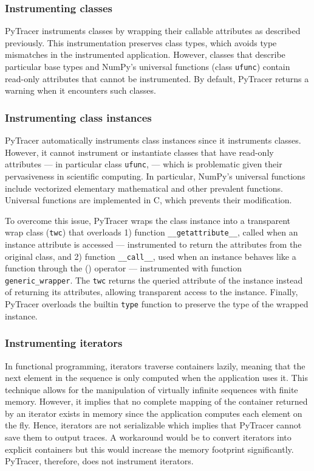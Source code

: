 \documentclass[10pt,journal,compsoc]{IEEEtran}
\newcommand{\pytracer}[0]{PyTracer\xspace}
\begin{document}
\subsubsection{Instrumenting classes}

\pytracer instruments classes by wrapping their callable attributes as described
previously. This instrumentation preserves class types, which avoids type
mismatches in the instrumented application. However, classes that describe
particular base types and NumPy's universal functions (class \texttt{ufunc})
contain read-only attributes that cannot be instrumented. By default, \pytracer
returns a warning when it encounters such classes.

\subsubsection{Instrumenting class instances}

\pytracer automatically instruments class instances since it instruments
classes. However, it cannot instrument or instantiate classes that have
read-only attributes --- in particular class \texttt{ufunc}, --- which is
problematic given their pervasiveness in scientific computing. In particular,
NumPy's universal functions include vectorized elementary mathematical and other
prevalent functions. Universal functions are implemented in C, which prevents
their modification.

To overcome this issue, \pytracer wraps the class instance into a transparent
wrap class (\texttt{twc}) that overloads 1) function
\texttt{\_\_getattribute\_\_}, called when an instance attribute is accessed ---
instrumented to return the attributes from the original class, and 2) function
\texttt{\_\_call\_\_}, used when an instance behaves like a function through the
() operator --- instrumented with function \texttt{generic\_wrapper}. The
\texttt{twc} returns the queried attribute of the instance instead of returning
its attributes, allowing transparent access to the instance.  Finally, \pytracer
overloads the builtin \texttt{type} function to preserve the type of the wrapped
instance.

\subsubsection{Instrumenting iterators}

In functional programming, iterators traverse containers lazily, meaning that
the next element in the sequence is only computed when the application uses it.
This technique allows for the manipulation of virtually infinite sequences with
finite memory. However, it implies that no complete mapping of the container
returned by an iterator exists in memory since the application computes each
element on the fly. Hence, iterators are not serializable which implies that
\pytracer cannot save them to output traces. A workaround would be to convert
iterators into explicit containers but this would increase the memory footprint
significantly. \pytracer, therefore, does not instrument iterators.
\end{document}
